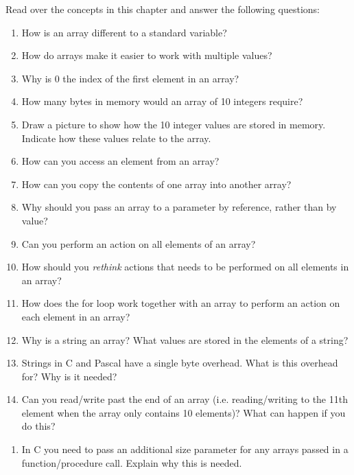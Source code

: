 Read over the concepts in this chapter and answer the following questions:
\begin{enumerate}
  \item How is an array different to a standard variable?
  \item How do arrays make it easier to work with multiple values?
  \item Why is 0 the index of the first element in an array?
  \item How many bytes in memory would an array of 10 integers require?
  \item Draw a picture to show how the 10 integer values are stored in memory. Indicate how these values relate to the array.
  \item How can you access an element from an array?
  \item How can you copy the contents of one array into another array?
  \item Why should you pass an array to a parameter by reference, rather than by value?
  \item Can you perform an action on all elements of an array?
  \item How should you \emph{rethink} actions that needs to be performed on all elements in an array?
  \item How does the for loop work together with an array to perform an action on each element in an array?
  \item Why is a string an array? What values are stored in the elements of a string?
  \item Strings in C and Pascal have a single byte overhead. What is this overhead for? Why is it needed?
  \item Can you read/write past the end of an array (i.e. reading/writing to the 11th element when the array only contains 10 elements)? What can happen if you do this?
\end{enumerate}

\bigskip

\csection
{
\begin{enumerate}
  \item In C you need to pass an additional size parameter for any arrays passed in a function/procedure call. Explain why this is needed.
\end{enumerate}
}

\clearpage

